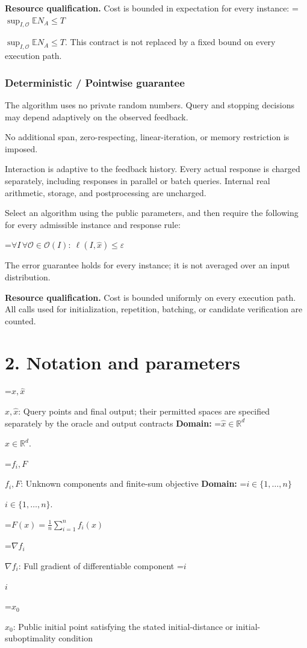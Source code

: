\documentclass[10pt,a4paper]{article}
\newcommand{\AtlasMath}[1]{\par\begingroup\centering\setbox0=\hbox{$\displaystyle #1$}\ifdim\wd0>1.4\linewidth\typeout{ATLAS WIDE FORMULA: \the\wd0}\fi\ifdim\wd0>\linewidth\resizebox{\linewidth}{!}{\box0}\else\box0\fi\par\endgroup}
\newcommand{\AtlasInlineMath}[1]{\begingroup\setbox0=\hbox{$#1$}\ifdim\wd0>.4\linewidth\endgroup\AtlasMath{#1}\else\endgroup$#1$\fi}
\begin{document}
\textbf{Resource qualification.} Cost is bounded in expectation for every instance: \AtlasInlineMath{\sup_{I,\mathcal O}\mathbb E N_A\le T}. This contract is not replaced by a fixed bound on every execution path.

\subsubsection{Deterministic / Pointwise guarantee}
The algorithm uses no private random numbers. Query and stopping decisions may depend adaptively on the observed feedback.

No additional span, zero-respecting, linear-iteration, or memory restriction is imposed.

Interaction is adaptive to the feedback history. Every actual response is charged separately, including responses in parallel or batch queries. Internal real arithmetic, storage, and postprocessing are uncharged.

Select an algorithm using the public parameters, and then require the following for every admissible instance and response rule:


\AtlasMath{\forall I\,\forall\mathcal{O}\in\mathcal{O}(I):\ \ell(I,\widehat{x})\le\varepsilon}


The error guarantee holds for every instance; it is not averaged over an input distribution.

\textbf{Resource qualification.} Cost is bounded uniformly on every execution path. All calls used for initialization, repetition, batching, or candidate verification are counted.

\section{2. Notation and parameters}
\AtlasInlineMath{x,\widehat{x}}: Query points and final output; their permitted spaces are specified separately by the oracle and output contracts \textbf{Domain:} \AtlasInlineMath{\widehat{x}\in \mathbb{R}^d}.

\AtlasInlineMath{f_i,F}: Unknown components and finite-sum objective \textbf{Domain:} \AtlasInlineMath{i\in\{1,\ldots,n\}}.


\AtlasMath{F(x)=\frac1n\sum_{i=1}^n f_i(x)}


\AtlasInlineMath{\nabla f_i}: Full gradient of differentiable component \AtlasInlineMath{i}

\AtlasInlineMath{x_0}: Public initial point satisfying the stated initial-distance or initial-suboptimality condition
\end{document}
